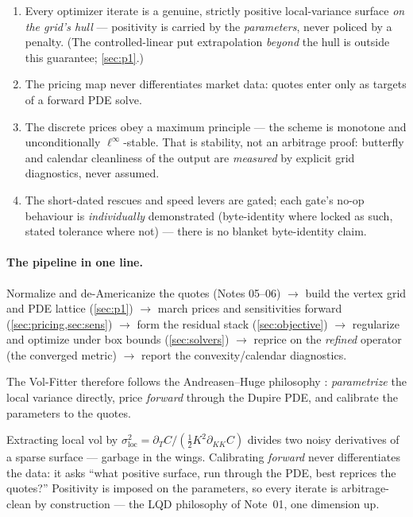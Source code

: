 \documentclass[11pt]{article}
\begin{document}
\begin{invariant}
\begin{enumerate}[leftmargin=1.6em]
\item Every optimizer iterate is a genuine, strictly positive local-variance
surface \emph{on the grid's hull} --- positivity is carried by the
\emph{parameters}, never policed by a penalty. (The controlled-linear put
extrapolation \emph{beyond} the hull is outside this guarantee;
\cref{sec:p1}.)
\item The pricing map never differentiates market data: quotes enter only as
targets of a forward PDE solve.
\item The discrete prices obey a maximum principle --- the scheme is monotone
and unconditionally $\ell^\infty$-stable. That is stability, not an arbitrage
proof: butterfly and calendar cleanliness of the output are \emph{measured}
by explicit grid diagnostics, never assumed.
\item The short-dated rescues and speed levers are gated; each gate's no-op
behaviour is \emph{individually} demonstrated (byte-identity where locked as
such, stated tolerance where not) --- there is no blanket byte-identity
claim.
\end{enumerate}
\end{invariant}

\paragraph{The pipeline in one line.} Normalize and de-Americanize the quotes
(Notes 05--06) $\to$ build the vertex grid and PDE lattice
(\cref{sec:p1}) $\to$ march prices and sensitivities forward
(\cref{sec:pricing,sec:sens}) $\to$ form the residual stack
(\cref{sec:objective}) $\to$ regularize and optimize under box bounds
(\cref{sec:solvers}) $\to$ reprice on the \emph{refined} operator
(the converged metric) $\to$ report the convexity/calendar diagnostics.

The Vol-Fitter therefore follows the Andreasen--Huge philosophy
\cite{AndreasenHuge2011}: \emph{parametrize} the local variance directly,
price \emph{forward} through the Dupire PDE, and calibrate the parameters to
the quotes.

\begin{heuristic}
Extracting local vol by
$\sigma_{\text{loc}}^2=\partial_TC/(\tfrac12K^2\partial_{KK}C)$ divides two
noisy derivatives of a sparse surface --- garbage in the wings. Calibrating
\emph{forward} never differentiates the data: it asks ``what positive surface,
run through the PDE, best reprices the quotes?'' Positivity is imposed on the
parameters, so every iterate is arbitrage-clean by construction --- the LQD
philosophy of Note~01, one dimension up.
\end{heuristic}
\end{document}

